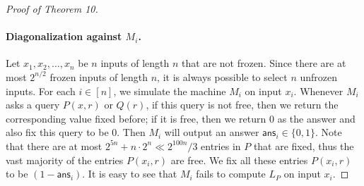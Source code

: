 \documentclass[10pt,a4paper]{article}
\begin{document}
\begin{proof}[Proof of Theorem 10]
\paragraph{Diagonalization against $M_i$.}
Let $x_1,x_2,\ldots,x_n$ be $n$ inputs of length $n$ that are not frozen. Since there are at most $2^{n/2}$ frozen inputs of length $n$, it is always possible to select $n$ unfrozen inputs. For each $i\in[n]$, we simulate the machine $M_i$ on input $x_i$. Whenever $M_i$ asks a query $P(x,r)$ or $Q(r)$, if this query is not free, then we return the corresponding value fixed before; if it is free, then we return $0$ as the answer and also fix this query to be $0$. Then $M_i$ will output an answer $\mathsf{ans}_i\in\{0,1\}$. Note that there are at most $2^{5n}+n\cdot2^n\ll2^{100n}/3$ entries in $P$ that are fixed, thus the vast majority of the entries $P(x_i,r)$ are free. We fix all these entries $P(x_i,r)$ to be $(1-\mathsf{ans}_i)$. It is easy to see that $M_i$ fails to compute $L_P$ on input $x_i$.

\end{proof}
\end{document}
